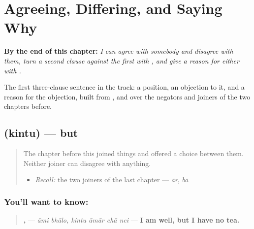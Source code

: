 
\chapter{Agreeing, Differing, and Saying Why}
\label{ch:bn-agreeing-differing-saying-why}

\begin{chapteropening}
\textbf{By the end of this chapter:} \emph{I can agree with somebody and disagree with them, turn a second clause against the first with , and give a reason for either with .}

The first three-clause sentence in the track: a position, an objection to it, and a reason for the objection, built from ,  and  over the negators and joiners of the two chapters before.
\end{chapteropening}

\section[\texorpdfstring{\bn{কিন্তু} (kintu)}{কিন্তু (kintu)}]{ (kintu) — but}

\label{lesson:BN-C18-kintu}



\begin{quote}
The chapter before this joined things and offered a choice between them. Neither joiner can disagree with anything.

\begin{itemize}
\raggedright
  \item \emph{Recall:} the two joiners of the last chapter — \emph{ār}, \emph{bā}
\end{itemize}
\end{quote}

\subsection*{You'll want to know: }
\begin{quote}
\textbf{ ,    } — \emph{āmi bhālo, kintu āmār chā nei} — \textbf{I am well, but I have no tea.}
\end{quote}

